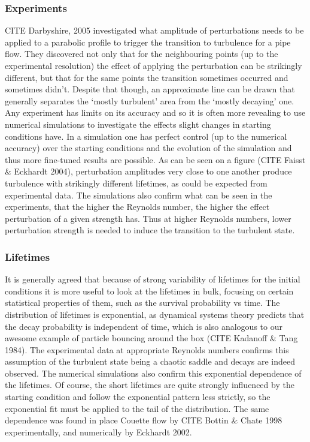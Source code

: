 \documentclass[11pt,a4paper]{article}
\begin{document}
\subsubsection{Experiments}
CITE Darbyshire, 2005 investigated what amplitude of perturbations needs to be applied to a parabolic profile to trigger the transition to turbulence for a pipe flow.
They discovered not only that for the neighbouring points (up to the experimental resolution) the effect of applying the perturbation can be strikingly different, but that for the same points the transition sometimes occurred and sometimes didn't.
Despite that though, an approximate line can be drawn that generally separates the `mostly turbulent' area from the `mostly decaying' one.
Any experiment has limits on its accuracy and so it is often more revealing to use numerical simulations to investigate the effects slight changes in starting conditions have.
In a simulation one has perfect control (up to the numerical accuracy) over the starting conditions and the evolution of the simulation and thus more fine-tuned results are possible.
As can be seen on a figure (CITE Faisst \& Eckhardt 2004), perturbation amplitudes very close to one another produce turbulence with strikingly different lifetimes, as could be expected from experimental data.
The simulations also confirm what can be seen in the experiments, that the higher the Reynolds number, the higher the effect perturbation of a given strength has.
Thus at higher Reynolds numbers, lower perturbation strength is needed to induce the transition to the turbulent state.

\subsubsection{Lifetimes}
It is generally agreed that because of strong variability of lifetimes for the initial conditions it is more useful to look at the lifetimes in bulk, focusing on certain statistical properties of them, such as the survival probability vs time.
The distribution of lifetimes is exponential, as dynamical systems theory predicts that the decay probability is independent of time, which is also analogous to our awesome example of particle bouncing around the box (CITE Kadanoff \& Tang 1984).
The experimental data at appropriate Reynolds numbers confirms this assumption of the turbulent state being a chaotic saddle and decays are indeed observed.
The numerical simulations also confirm this exponential dependence of the lifetimes.
Of course, the short lifetimes are quite strongly influenced by the starting condition and follow the exponential pattern less strictly, so the exponential fit must be applied to the tail of the distribution.
The same dependence was found in place Couette flow by CITE Bottin \& Chate 1998 experimentally, and numerically by Eckhardt 2002.
\end{document}

